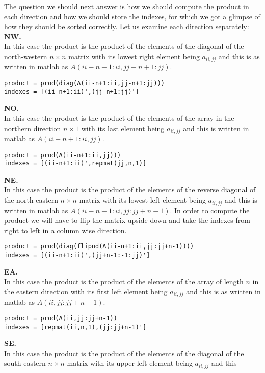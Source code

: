 \documentclass[10pt]{article}
\begin{document}
The question we should next answer is how  we should compute the product in each 
direction and how we should store the indexes, for which we got a glimpse of how they 
should be sorted correctly. Let us examine each direction separately:\\
\textbf{{\color{red}NW.}}\\
In this case the product is the product of the elements of the diagonal of the 
north-western $n\times n$ matrix with its lowest right element being $a_{ii,jj}$ and this 
is as written 
in {\color{red}matlab} as $A(ii-n+1:ii,jj-n+1:jj)$. 
\begin{lstlisting}
product = prod(diag(A(ii-n+1:ii,jj-n+1:jj)))
indexes = [(ii-n+1:ii)',(jj-n+1:jj)']  
\end{lstlisting}
\textbf{{\color{red}NO.}}\\
In this case the product is the product of the elements of the array in the northern
direction $n\times 1$ with its last element being $a_{ii,jj}$ and this is written in 
{\color{red}matlab} as $A(ii-n+1:ii,jj)$. 
\begin{lstlisting}
product = prod(A(ii-n+1:ii,jj)))
indexes = [(ii-n+1:ii)',repmat(jj,n,1)]  
\end{lstlisting}
\textbf{{\color{red}NE.}}\\
In this case the product is the product of the elements of the reverse diagonal of the 
north-eastern $n\times n$ matrix with its lowest left element being $a_{ii,jj}$ and this 
is 
 written in {\color{red}matlab} as $A(ii-n+1:ii,jj:jj+n-1)$. In order to compute the 
product we will have to flip the matrix upside down and take the indexes from right to 
left in a column wise direction.
\begin{lstlisting}
product = prod(diag(flipud(A(ii-n+1:ii,jj:jj+n-1))))
indexes = [(ii-n+1:ii)',(jj+n-1:-1:jj)']  
\end{lstlisting}
\textbf{{\color{red}EA.}}\\
In this case the product is the product of the elements of the array of length $n$ in the 
eastern direction with its first left element 
being $a_{ii,jj}$ and this is as written in {\color{red}matlab} as $A(ii,jj:jj+n-1)$. 
\begin{lstlisting}
product = prod(A(ii,jj:jj+n-1))
indexes = [repmat(ii,n,1),(jj:jj+n-1)']  
\end{lstlisting}
\textbf{{\color{red}SE.}}\\
In this case the product is the product of the elements of the diagonal of the 
south-eastern $n\times n$ matrix with its upper left element being $a_{ii,jj}$ and this 
\end{document}
